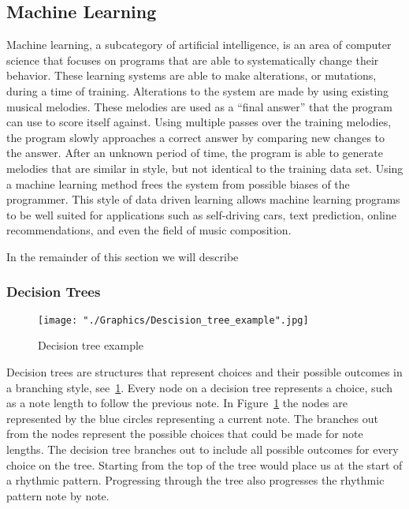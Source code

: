 \documentclass{sig-alternate}
\begin{document}
\subsection{Machine Learning}
\label{sec:machinelearning}
	Machine learning, a subcategory of artificial intelligence, is an area of computer science that focuses on programs that are able to systematically change their behavior. These learning systems are able to make alterations, or mutations, during a time of training. Alterations to the system are made by using existing musical melodies. These melodies are used as a ``final answer'' that the program can use to score itself against.  Using multiple passes over the training melodies, the program slowly approaches a correct answer by comparing new changes to the answer. After an unknown period of time, the program is able to generate melodies that are similar in style, but not identical to the training data set. Using a machine learning method frees the system from possible biases of the programmer. This style of data driven learning allows machine learning programs to be well suited for applications such as self-driving cars, text prediction, online recommendations, and even the field of music composition.
	
	In the remainder of this section we will describe 

\subsubsection{Decision Trees}
\label{sec:decision_trees}

\begin{figure}[p]
	\texttt{[image: "./Graphics/Descision\_tree\_example".jpg]}
	\caption{Decision tree example}
	\label{fig:decisiontree}
\end{figure}

Decision trees are structures that represent choices and their possible outcomes in a branching style, see~\ref{fig:decisiontree}. Every node on a decision tree represents a choice, such as a note length to follow the previous note. In Figure~\ref{fig:decisiontree} the nodes are represented by the blue circles representing a current note. The branches out from the nodes represent the possible choices that could be made for note lengths. The decision tree branches out to include all possible outcomes for every choice on the tree.  Starting from the top of the tree would place us at the start of a rhythmic pattern. Progressing through the tree also progresses the rhythmic pattern note by note. 
\end{document}

